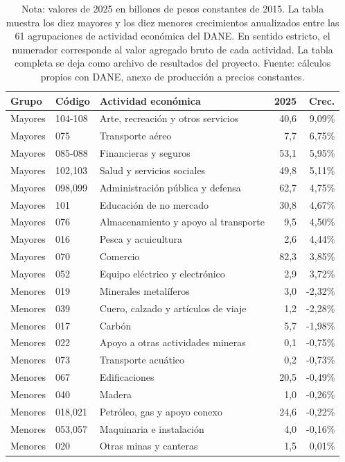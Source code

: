 \begin{table}[H]
\centering
\caption{Mayores y menores crecimientos del PIB, 61 agrupaciones CIIU, 2010--2025}
\label{tab:valor_agregado_61_agrupaciones}
\small
\begin{tabular}{llp{}rr}
\toprule
Grupo & Código & Actividad económica & 2025 & Crec. \\
\midrule
Mayores & 104-108 & Arte, recreación y otros servicios & 40,6 & 9,09\% \\
Mayores & 075 & Transporte aéreo & 7,7 & 6,75\% \\
Mayores & 085-088 & Financieras y seguros & 53,1 & 5,95\% \\
Mayores & 102,103 & Salud y servicios sociales & 49,8 & 5,11\% \\
Mayores & 098,099 & Administración pública y defensa & 62,7 & 4,75\% \\
Mayores & 101 & Educación de no mercado & 30,8 & 4,67\% \\
Mayores & 076 & Almacenamiento y apoyo al transporte & 9,5 & 4,50\% \\
Mayores & 016 & Pesca y acuicultura & 2,6 & 4,44\% \\
Mayores & 070 & Comercio & 82,3 & 3,85\% \\
Mayores & 052 & Equipo eléctrico y electrónico & 2,9 & 3,72\% \\
Menores & 019 & Minerales metalíferos & 3,0 & -2,32\% \\
Menores & 039 & Cuero, calzado y artículos de viaje & 1,2 & -2,28\% \\
Menores & 017 & Carbón & 5,7 & -1,98\% \\
Menores & 022 & Apoyo a otras actividades mineras & 0,1 & -0,75\% \\
Menores & 073 & Transporte acuático & 0,2 & -0,73\% \\
Menores & 067 & Edificaciones & 20,5 & -0,49\% \\
Menores & 040 & Madera & 1,0 & -0,26\% \\
Menores & 018,021 & Petróleo, gas y apoyo conexo & 24,6 & -0,22\% \\
Menores & 053,057 & Maquinaria e instalación & 4,0 & -0,16\% \\
Menores & 020 & Otras minas y canteras & 1,5 & 0,01\% \\
\bottomrule
\end{tabular}
\caption*{\footnotesize Nota: valores de 2025 en billones de pesos constantes de 2015. La tabla muestra los diez mayores y los diez menores crecimientos anualizados entre las 61 agrupaciones de actividad económica del DANE. En sentido estricto, el numerador corresponde al valor agregado bruto de cada actividad. La tabla completa se deja como archivo de resultados del proyecto. Fuente: cálculos propios con DANE, anexo de producción a precios constantes.}
\end{table}

